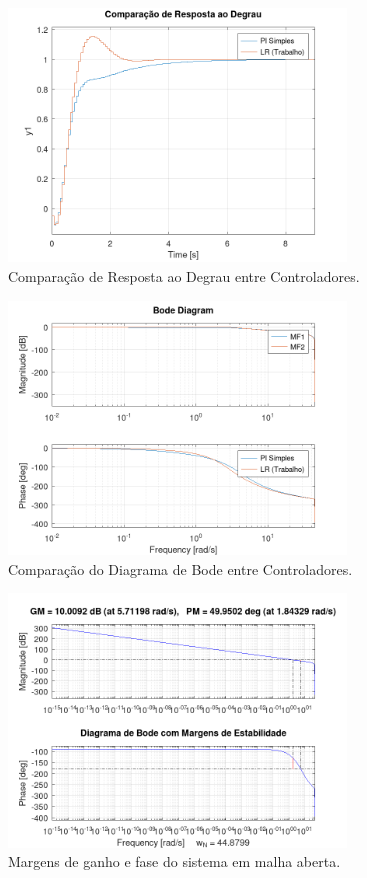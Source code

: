 \documentclass[a4paper,12pt]{article}
\begin{document}
\begin{figure}[H]
    \centering
    \includegraphics[width=0.8\textwidth]{figura_comparacao_step.png}
    \caption{Comparação de Resposta ao Degrau entre Controladores.}
    \label{fig:comparacao_step_main}
\end{figure}

\begin{figure}[H]
    \centering
    \includegraphics[width=0.8\textwidth]{figura_comparacao_bode.png}
    \caption{Comparação do Diagrama de Bode entre Controladores.}
    \label{fig:comparacao_bode_main}
\end{figure}

\begin{figure}[H]
    \centering
    \includegraphics[width=0.8\textwidth]{figura_margens_estabilidade.png}
    \caption{Margens de ganho e fase do sistema em malha aberta.}
    \label{fig:margens_main}
\end{figure}
\end{document}
